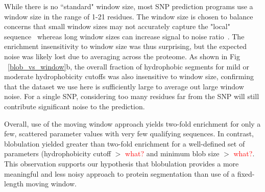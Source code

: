 \documentclass[10pt,letterpaper]{article}
\newcommand{\hydrochar}{hydrophobicity class}
\newcommand{\grace}[1]{\textcolor{red}{#1}}
\begin{document}
While there is no ``standard" window size, most SNP prediction programs use a window size in the range of 1-21 residues. The window size is chosen to balance concerns that small window sizes may not accurately capture the "local" sequence~\cite{Chen2006, Schlessinger2005, Sander2006} whereas long window sizes can increase signal to noise ratio~\cite{Park2007}. The enrichment insensitivity to window size was thus surprising, but the expected noise was likely lost due to averaging across the proteome.  
As shown in Fig ~\ref{blob_vs_window}b, the overall fraction of hydrophobic segments for mild or moderate hydrophobicity cutoffs was also insensitive to window size, confirming that the dataset we use here is sufficiently large to average out large window noise. For a single SNP, considering too many residues far from the SNP will still contribute significant noise to the prediction.  


Overall, use of the moving window approach yields two-fold enrichment for only a few, scattered parameter values with very few qualifying sequences. 
In contrast, blobulation yielded greater than two-fold enrichment for a well-defined set of parameters (hydrophobicity cutoff $>$ \grace{what?} and minimum blob size $>$ \grace{what?}.  
This observation supports our hypothesis that blobulation provides a more meaningful and less noisy approach to protein segmentation than use of a fixed-length moving window.

\end{document}
